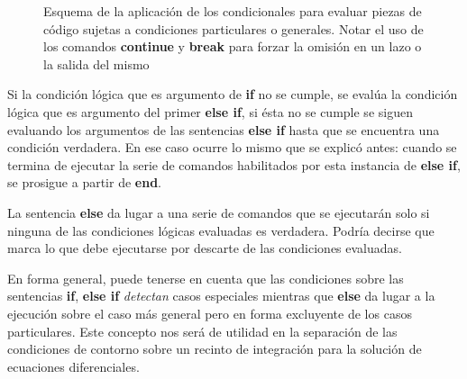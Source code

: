 \begin{figure}
  
  \caption{Esquema de la aplicación de los condicionales   para 
  evaluar piezas de código sujetas a condiciones 
  particulares o generales. Notar el uso de los comandos 
  \protect\textbf{continue} y \protect\textbf{break} para forzar la 
  omisión en un lazo o la salida del mismo
  \label{FigMatlabIf}
  }

\end{figure}

Si la condición lógica que es argumento de \textbf{if}
no se cumple, se evalúa 
la condición lógica que es argumento del 
primer \textbf{else if}, si ésta no se cumple 
se siguen evaluando los argumentos de las
sentencias \textbf{else if} hasta que se encuentra 
una condición verdadera. En ese caso ocurre lo 
mismo que se explicó antes: cuando se termina
de ejecutar la serie de comandos habilitados
por esta instancia de \textbf{else if}, se
prosigue a partir de \textbf{end}.

La sentencia \textbf{else} da lugar a una serie de
comandos que se ejecutarán solo si ninguna de las 
condiciones lógicas evaluadas es verdadera. 
Podría decirse que marca lo que debe ejecutarse por 
descarte de las condiciones evaluadas. 

En forma general, puede tenerse en cuenta que las 
condiciones sobre las sentencias \textbf{if}, 
\textbf{else if} \emph{ detectan} casos especiales
mientras que \textbf{else} da lugar a la ejecución
sobre el caso más general pero en forma 
excluyente de los casos particulares. Este 
concepto nos será de utilidad en la separación
de las condiciones de contorno sobre un 
recinto de integración para la solución
de ecuaciones diferenciales. 

\mode*
